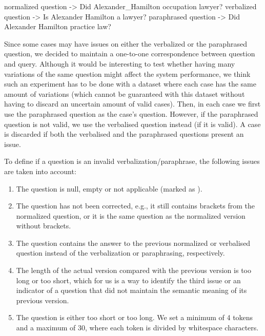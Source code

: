 \begin{sparqlcode}[%
    caption={Example of questions contained in one case of the \LCQuADtwo{} dataset.}, 
    label={lst:questionExampleLcquad2}]
normalized question  -> Did {Alexander_Hamilton} {occupation} {lawyer}?
verbalized question  -> Is Alexander Hamilton a lawyer?
paraphrased question -> Did Alexander Hamilton practice law?
\end{sparqlcode}

Since some cases may have issues on either the verbalized or the paraphrased question, we 
decided to maintain a one-to-one correspondence between question and query. Although it would 
be interesting to test whether having many variations of the same question might affect the 
system performance, we think such an experiment has to be done with a dataset where each case has 
the same amount of variations (which cannot be guaranteed with this dataset without having to 
discard an uncertain amount of valid cases). Then, in each case we first use the paraphrased 
question as the case’s question. However, if the paraphrased question is not valid, we use the 
verbalised question instead (if it is valid). A case is discarded if both the verbalised and 
the paraphrased questions present an issue.

To define if a question is an invalid verbalization/paraphrase, the following issues are taken 
into account:

\begin{enumerate}
    \item The question is null, empty or not applicable (marked as ). 
    \item The question has not been corrected, e.g., it still contains brackets from the normalized 
    question, or it is the same question as the normalized version without brackets.
    \item The question contains the answer to the previous normalized or verbalised question 
    instead of the verbalization or paraphrasing, respectively. 
    \item The length of the actual version compared with the previous version is too long or too 
    short, which for us is a way to identify the third issue or an indicator of a question that 
    did not maintain the semantic meaning of its previous version.
    \item The question is either too short or too long. We set a minimum of 4 tokens and a 
    maximum of 30, where each token is divided by whitespace characters.
\end{enumerate}


